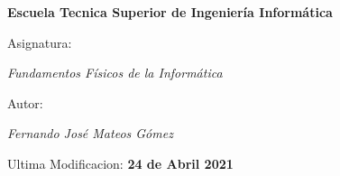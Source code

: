 \begin{titlepage}
        \centering
        {\bfseries\LARGE Escuela Tecnica Superior de Ingeniería Informática \par}
        \vspace{1cm}
        {\Large Asignatura: \par \textit{Fundamentos Físicos de la Informática} \par}
        \vspace{1cm}
        {\Large Autor: \par \textit{Fernando José Mateos Gómez} \par}
        \vspace{2cm}
        {\Large Ultima Modificacion: \textbf{24 de Abril 2021} \par}
        \vspace{2cm}
\end{titlepage}
\restoregeometry